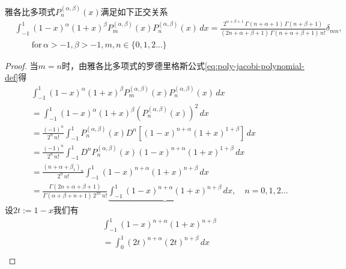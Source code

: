 \begin{subappendices}
\begin{theorem}[雅各比多项式的正交条件]
  雅各比多项式$P_n^{(\alpha,\beta)}(x)$满足如下正交关系
  \begin{equation}
    \label{eq:poly-jacobi-orthogonality-relation}
    \begin{split}
      &\int_{-1}^{1} (1-x)^{\alpha} (1+x)^{\beta} P_m^{(\alpha,\beta)}(x) P_n^{(\alpha,\beta)}(x) \, dx = \frac{
      2^{\alpha + \beta + 1} \, \Gamma(n+\alpha+1) \, \Gamma (n + \beta + 1)
      }{
      \left( 2n + \alpha + \beta + 1 \right) \, \Gamma(n+\alpha+\beta+1) \, n!
      } \delta_{mn}, \\
      & \qquad \text{for} \, \alpha > -1, \beta > -1, m,n \in \{0,1,2\ldots\}
    \end{split}
  \end{equation}
\end{theorem}
\begin{proof}
  当$m=n$时，由雅各比多项式的罗德里格斯公式\eqref{eq:poly-jacobi-polynomial-def}得
\begin{equation*}
\begin{split}
  &\int_{-1}^{1} (1-x)^{\alpha} (1+x)^{\beta} P_m^{(\alpha,\beta)}(x) P_n^{(\alpha,\beta)}(x) \, dx \\
  &= \int_{-1}^{1} (1-x)^{\alpha} (1+x)^{\beta} \left( P_n^{(\alpha,\beta)}(x) \right)^2 \, dx \\
  &= \frac{(-1)^n}{2^n \, n!} \int_{-1}^{1} P_n^{(\alpha,\beta)}(x) D^n \left[ (1-x)^{n+\alpha} (1+x)^{1+\beta} \right] \, dx\\
  &= \frac{(-1)^n}{2^n \, n!} \int_{-1}^{1}  D^n P_n^{(\alpha,\beta)}(x) (1-x)^{n+\alpha} (1+x)^{1+\beta} \, dx\\
  &= \frac{\left( n + \alpha + \beta _ 1 \right)_{n}}{2^n \, n!} \int_{-1}^{1} (1-x)^{n+\alpha} (1+x)^{n+\beta} \, dx\\
  &=\frac{
  \Gamma(2n+\alpha+\beta+1)
  }{
  \Gamma(\alpha + \beta + n + 1) \, 2^{2n}  \, n!
  }
  \underbrace{\int_{-1}^{1} (1-x)^{n+\alpha} (1+x)^{n+\beta}} \, dx, \quad n=0,1,2 \ldots
\end{split}
\end{equation*}
设$2t := 1-x$我们有
\begin{equation*}
  \begin{split}
    &\int_{-1}^{1} (1-x)^{n+\alpha} (1+x)^{n+\beta} \\
    &= \int_{0}^{1} (2t)^{n+\alpha} (2t)^{n+\beta} \, dx \\

\end{split}
\end{equation*}
\end{proof}
\end{subappendices}
